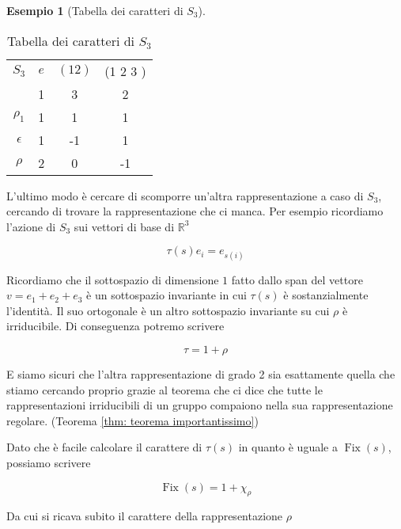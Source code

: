 \documentclass[11pt]{article}
\theoremstyle{plain}
\theoremstyle{definition}
\newtheorem{exmp}{Esempio}[section]
\theoremstyle{remark}
\DeclareMathOperator{\Fix}{Fix}
\begin{document}
\begin{exmp}[Tabella dei caratteri di $S_3$]
\begin{table}[!ht]
\centering
\begin{tabular}{|c|c|c|c|}
\hline
$S_3$  & $e$ & $(1 2)$ & (1 2 3 )    \\
 & 1 & 3 & 2 \\
\hline
 $\rho_1$ & 1 & 1  & 1 \\
\hline
$\epsilon$ & 1 & -1 & 1 \\
\hline
$\rho$ & 2 & 0 & -1 \\
\hline
\end{tabular}
\caption{Tabella dei caratteri di $S_3$}
\label{tabella caratteri s3}
\end{table}

L'ultimo modo è cercare di scomporre un'altra rappresentazione a caso di $S_3$, cercando di trovare la rappresentazione che ci manca. Per esempio ricordiamo l'azione di $S_3$ sui vettori di base di $\mathbb{R}^3$

\[ \tau(s) e_i = e_{s(i)}\]

Ricordiamo che il sottospazio di dimensione $1$ fatto dallo span del vettore $v = e_1 + e_2 + e_3$ è un sottospazio invariante in cui $\tau(s)$ è sostanzialmente l'identità. Il suo ortogonale è un altro sottospazio invariante su cui $\rho$ è irriducibile. Di conseguenza potremo scrivere

\[ \tau = 1 + \rho\]

E siamo sicuri che l'altra rappresentazione di grado 2 sia esattamente quella che stiamo cercando proprio grazie al teorema che ci dice che tutte le rappresentazioni irriducibili di un gruppo compaiono nella sua rappresentazione regolare. (Teorema \ref{thm: teorema importantissimo})

Dato che è facile calcolare il carattere di $\tau(s)$ in quanto è uguale a $\Fix(s)$, possiamo scrivere

\[ \Fix(s) = 1 + \chi_\rho\]

Da cui si ricava subito il carattere della rappresentazione $\rho$



\end{exmp}
\end{document}
